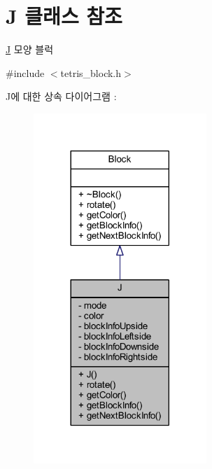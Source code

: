 \hypertarget{class_j}{}\section{J 클래스 참조}
\label{class_j}


\mbox{\hyperlink{class_j}{J}} 모양 블럭  




{\ttfamily \#include $<$tetris\+\_\+block.\+h$>$}



J에 대한 상속 다이어그램 \+: 
\nopagebreak
\begin{figure}[H]
\begin{center}
\leavevmode
\includegraphics[width=185pt]{class_j__inherit__graph}
\end{center}
\end{figure}


